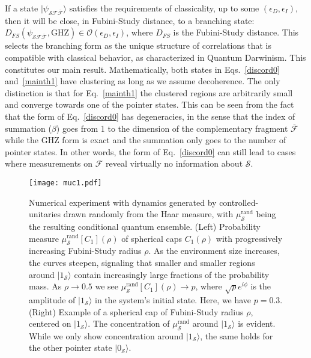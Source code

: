 \documentclass[a4paper,11pt,accepted=2024-09-14]{quantumarticle}
\newcommand{\ket}[1]    {| #1 \rangle}
\newcommand{\+}         {\dagger}
\newcommand{\mc}[1]{\mathcal{#1}}
\begin{document}

If a state $\ket{\psi_{\mc{S}\mc{F}\overline{\mc{F}}}}$ satisfies the requirements of classicality, up to some $(\epsilon_D,\epsilon_I)$, then it will be close, in Fubini-Study distance, to a branching state: $D_{FS}(\psi_{\mc{S}\mc{F}\overline{\mc{F}}},\mathrm{GHZ}) \in \mathcal{O}(\epsilon_D,\epsilon_I)$, where $D_{FS}$ is the Fubini-Study distance. This selects the branching form as the unique structure of correlations that is compatible with classical behavior, as characterized in Quantum Darwinism. This constitutes our main result. {Mathematically, both states in Eqs.~\ref{discord0} and~\ref{mainth1} have clustering as long as we assume decoherence. The only distinction is that for Eq.~\ref{mainth1} the clustered regions are arbitrarily small and converge towards one of the pointer states. This can be seen from the fact that the form of Eq.~\ref{discord0} has degeneracies, in the sense that the index of summation ($\beta$) goes from 1 to the dimension of the complementary fragment $\overline{\mc{F}}$ while the GHZ form is exact and the summation only goes to the number of pointer states. In other words, the form of Eq.~\ref{discord0} can still lead to cases where measurements on $\mc{F}$ reveal virtually no information about $\mc{S}$.}


\begin{figure*}
    \centering
    \texttt{[image: muc1.pdf]}
    \caption{{Numerical experiment with dynamics generated by controlled-unitaries drawn randomly from the Haar measure, with $\mu_{\mc{S}}^{\mathrm{rand}}$ being the resulting {conditional quantum ensemble}. (Left) Probability measure $\mu^{\mathrm{rand}}_{\mc{S}}[C_1](\rho)$ of spherical caps $C_1(\rho)$ with progressively increasing Fubini-Study radius $\rho$. As the environment size increases, the curves steepen, signaling that smaller and smaller regions around $\ket{1_{\mc{S}}}$ contain increasingly large fractions of the probability mass. As $\rho \to 0.5$ we see $\mu^{\mathrm{rand}}_{\mc{S}}[C_1](\rho) \to p$, where $\sqrt{p}e^{i\phi}$ is the amplitude of $\ket{1_{\mc{S}}}$ in the system's initial state. Here, we have  $p=0.3$. (Right) Example of a spherical cap of Fubini-Study radius $\rho$, centered on $\ket{1_{\mc{S}}}$.
    The concentration of $\mu_\mc{S}^{\mathrm{rand}}$ around $\ket{1_{\mc{S}}}$ is evident. 
    While we only show concentration around $\ket{1_{\mc{S}}}$, the same holds for the other pointer state $\ket{0_{\mc{S}}}$.}}
    \label{fig:numerical_example}
\end{figure*}
\end{document}
